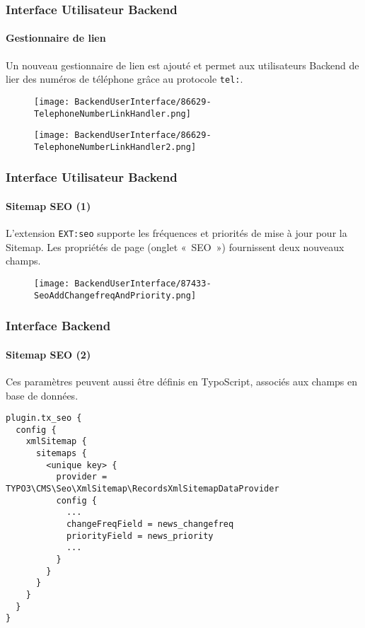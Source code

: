 
\begin{frame}[fragile]
	\frametitle{Interface Utilisateur Backend}
	\framesubtitle{Gestionnaire de lien}

	Un nouveau gestionnaire de lien est ajouté et permet aux utilisateurs Backend de lier des numéros de
	téléphone grâce au protocole \texttt{tel:}.

	\begin{figure}
		\texttt{[image: BackendUserInterface/86629-TelephoneNumberLinkHandler.png]}
	\end{figure}

	\begin{figure}
		\texttt{[image: BackendUserInterface/86629-TelephoneNumberLinkHandler2.png]}
	\end{figure}

\end{frame}


\begin{frame}[fragile]
	\frametitle{Interface Utilisateur Backend}
	\framesubtitle{Sitemap SEO (1)}

	L'extension \texttt{EXT:seo} supporte les fréquences et priorités de mise à jour pour la Sitemap.
	Les propriétés de page (onglet «~SEO~») fournissent deux nouveaux champs.

	\begin{figure}
		\texttt{[image: BackendUserInterface/87433-SeoAddChangefreqAndPriority.png]}
	\end{figure}

\end{frame}


\begin{frame}[fragile]
	\frametitle{Interface Backend}
	\framesubtitle{Sitemap SEO (2)}

	\lstset{basicstyle=\tiny\ttfamily}

	Ces paramètres peuvent aussi être définis en TypoScript, associés aux champs en base de données.
	
	\begin{lstlisting}
plugin.tx_seo {
  config {
    xmlSitemap {
      sitemaps {
        <unique key> {
          provider = TYPO3\CMS\Seo\XmlSitemap\RecordsXmlSitemapDataProvider
          config {
            ...
            changeFreqField = news_changefreq
            priorityField = news_priority
            ...
          }
        }
      }
    }
  }
}
	\end{lstlisting}

\end{frame}

